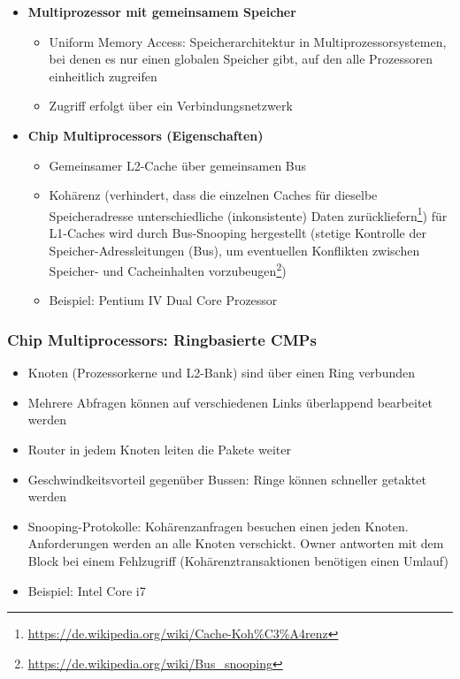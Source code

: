 \begin{itemize}
\begin{itemize}
	\end{itemize}
	\item \textbf{Multiprozessor mit gemeinsamem Speicher}
	\begin{itemize}
		\item Uniform Memory Access: Speicherarchitektur in Multiprozessorsystemen, bei denen es nur einen globalen Speicher gibt, auf den alle Prozessoren einheitlich zugreifen
		\item Zugriff erfolgt über ein Verbindungsnetzwerk
	\end{itemize}
	\item \textbf{Chip Multiprocessors (Eigenschaften)}
	\begin{itemize}
		\item Gemeinsamer L2-Cache über gemeinsamen Bus
		\item Kohärenz (verhindert, dass die einzelnen Caches für dieselbe Speicheradresse unterschiedliche (inkonsistente) Daten zurückliefern\footnote{\url{https://de.wikipedia.org/wiki/Cache-Koh\%C3\%A4renz}}) für L1-Caches wird durch Bus-Snooping hergestellt (stetige Kontrolle der Speicher-Adressleitungen (Bus), um eventuellen Konflikten zwischen Speicher- und Cacheinhalten vorzubeugen\footnote{\url{https://de.wikipedia.org/wiki/Bus_snooping}})
		\item Beispiel: Pentium IV Dual Core Prozessor
	\end{itemize}
\end{itemize}

\subsubsection{Chip Multiprocessors: Ringbasierte CMPs}
\begin{itemize}
	\item Knoten (Prozessorkerne und L2-Bank) sind über einen Ring verbunden
	\item Mehrere Abfragen können auf verschiedenen Links überlappend bearbeitet werden
	\item Router in jedem Knoten leiten die Pakete weiter
	\item Geschwindkeitsvorteil gegenüber Bussen: Ringe können schneller getaktet werden
	\item Snooping-Protokolle: Kohärenzanfragen besuchen einen jeden Knoten. Anforderungen werden an alle Knoten verschickt. Owner antworten mit dem Block bei einem Fehlzugriff (Kohärenztransaktionen benötigen einen Umlauf)
	\item Beispiel: Intel Core i7
\end{itemize}



